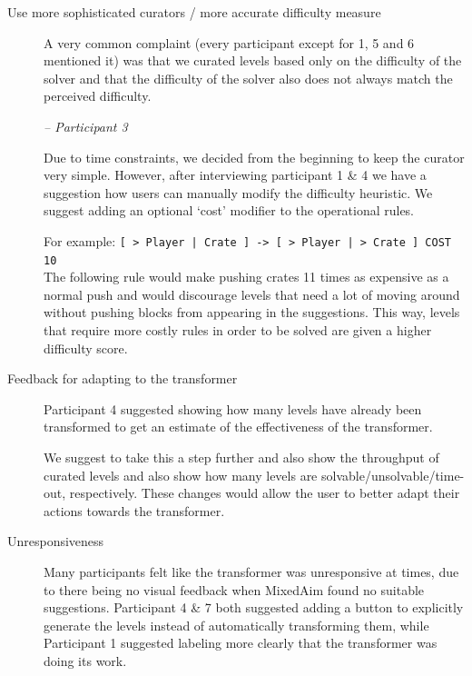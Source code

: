 \begin{description}
    \item[Use more sophisticated curators / more accurate difficulty measure]
A very common complaint (every participant except for 1, 5 and 6 mentioned it) was that we curated levels based only on the difficulty of the solver and that the difficulty of the solver also does not always match the perceived difficulty.

\textit{ -- Participant 3}

Due to time constraints, we decided from the beginning to keep the curator very simple. However, after interviewing participant 1 \& 4 we have a suggestion how users can manually modify the difficulty heuristic. We suggest adding an optional `cost' modifier to the operational rules. 

 For example: \lstinline{[ > Player | Crate ] -> [ > Player | > Crate ] COST 10} \hfill \\
 The following rule would make pushing crates 11 times as expensive as a normal push and would discourage levels that need a lot of moving around without pushing blocks from appearing in the suggestions.
 This way, levels that require more costly rules in order to be solved are given a higher difficulty score.

 

    \item[Feedback for adapting to the transformer]
    Participant 4 suggested showing how many levels have already been transformed to get an estimate of the effectiveness of the transformer.
    
    We suggest to take this a step further and also show the throughput of curated levels and also show how many levels are solvable/unsolvable/time-out, respectively. These changes would allow the user to better adapt their actions towards the transformer. 
    
    \item[Unresponsiveness]
    Many participants felt like the transformer was unresponsive at times, due to there being no visual feedback when MixedAim found no suitable suggestions. Participant 4 \& 7 both suggested adding a button to explicitly generate the levels instead of automatically transforming them, while Participant 1 suggested labeling more clearly that the transformer was doing its work.
    

\end{description}
